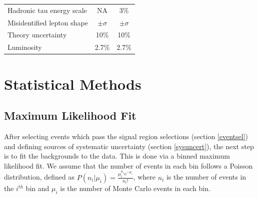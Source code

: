 \documentclass[oneside, letterpaper, oldfontcommands]{memoir}
\begin{document}
\begin{table}[t]
{\begin{tabular}{l|c|c}
Hadronic tau energy scale                              &        NA             &  3$\%$ \\
Misidentified lepton shape                             &        $\pm\sigma$              &  $\pm\sigma$  \\ \hline  \hline
Theory uncertainty                                     &              10\%          &    10\%  \\ \hline \hline
Luminosity                                             &              2.7\%          &    2.7\%  \\ \hline
  \end{tabular}
}
\end{table}

\section{Statistical Methods}\label{statmeth}
\subsection{Maximum Likelihood Fit}
\qquad After selecting events which pass the signal region selections (section \ref{eventsel}) and defining sources of systematic uncertainty (section \ref{sysuncert}), the next step is to fit the backgrounds to the data. This is done via a binned maximum likelihood fit.\cite{BevingtonRobinson200207}\cite{Conway:2011in} We assume that the number of events in each bin follows a Poisson distribution, defined as $P(n_{i}|\mu_{i}) = \frac{\mu_{i}^{n_{i}}e^{-\mu_{i}}}{n_{i}!}$, where $n_{i}$ is the number of events in the $i^{th}$ bin and $\mu_{i}$ is the number of Monte Carlo events in each bin. 
\end{document}
